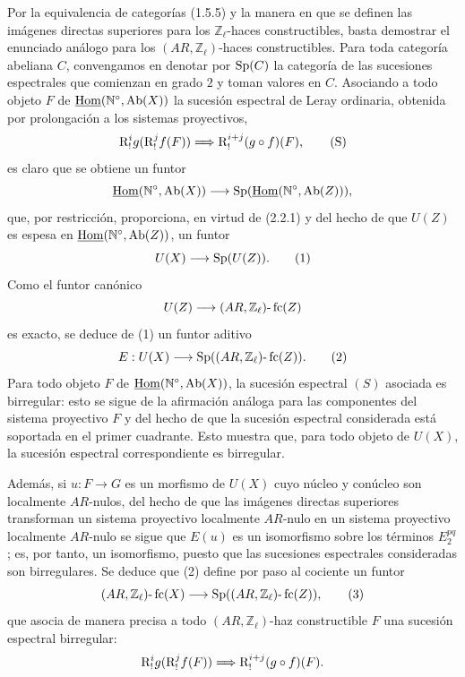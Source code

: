 \begin{prooftext}[Demostración]
Por la equivalencia de categorías (1.5.5) y la manera en que se definen las imágenes directas superiores para los \(\mathbb Z_\ell\)-haces constructibles, basta demostrar el enunciado análogo para los \((AR,\mathbb Z_\ell)\)-haces constructibles. Para toda categoría abeliana \(C\), convengamos en denotar por \(\operatorname{Sp}(C)\) la categoría de las sucesiones espectrales que comienzan en grado \(2\) y toman valores en \(C\). Asociando a todo objeto \(F\) de \(\underline{\operatorname{Hom}}(\mathbb N^\circ,\operatorname{Ab}(X))\) la sucesión espectral de Leray ordinaria, obtenida por prolongación a los sistemas proyectivos,
\[
\mathrm{R}^i_! g(\mathrm{R}^j_! f(F))\Longrightarrow \mathrm{R}^{i+j}_!(g\circ f)(F),
\tag{S}
\]
es claro que se obtiene un funtor
\[
\underline{\operatorname{Hom}}(\mathbb N^\circ,\operatorname{Ab}(X))\longrightarrow \operatorname{Sp}(\underline{\operatorname{Hom}}(\mathbb N^\circ,\operatorname{Ab}(Z))),
\]
que, por restricción, proporciona, en virtud de (2.2.1) y del hecho de que \(U(Z)\) es espesa en \(\underline{\operatorname{Hom}}(\mathbb N^\circ,\operatorname{Ab}(Z))\), un funtor
\[
U(X)\longrightarrow \operatorname{Sp}(U(Z)).
\tag{1}
\]
Como el funtor canónico
\[
U(Z)\longrightarrow (AR,\mathbb Z_\ell)\text{-}\operatorname{fc}(Z)
\]
es exacto, se deduce de (1) un funtor aditivo
\[
E:U(X)\longrightarrow \operatorname{Sp}((AR,\mathbb Z_\ell)\text{-}\operatorname{fc}(Z)).
\tag{2}
\]
Para todo objeto \(F\) de \(\underline{\operatorname{Hom}}(\mathbb N^\circ,\operatorname{Ab}(X))\), la sucesión espectral \((S)\) asociada es birregular: esto se sigue de la afirmación análoga para las componentes del sistema proyectivo \(F\) y del hecho de que la sucesión espectral considerada está soportada en el primer cuadrante. Esto muestra que, para todo objeto de \(U(X)\), la sucesión espectral correspondiente es birregular.

Además, si \(u:F\to G\) es un morfismo de \(U(X)\) cuyo núcleo y conúcleo son localmente \(AR\)-nulos, del hecho de que las imágenes directas superiores transforman un sistema proyectivo localmente \(AR\)-nulo en un sistema proyectivo localmente \(AR\)-nulo se sigue que \(E(u)\) es un isomorfismo sobre los términos \(E_2^{pq}\); es, por tanto, un isomorfismo, puesto que las sucesiones espectrales consideradas son birregulares. Se deduce que (2) define por paso al cociente un funtor
\[
(AR,\mathbb Z_\ell)\text{-}\operatorname{fc}(X)
\longrightarrow \operatorname{Sp}((AR,\mathbb Z_\ell)\text{-}\operatorname{fc}(Z)),
\tag{3}
\]
que asocia de manera precisa a todo \((AR,\mathbb Z_\ell)\)-haz constructible \(F\) una sucesión espectral birregular:
\[
\mathrm{R}^i_!g(\mathrm{R}^j_!f(F))\Longrightarrow \mathrm{R}^{i+j}_!(g\circ f)(F).
\]
\end{prooftext}
